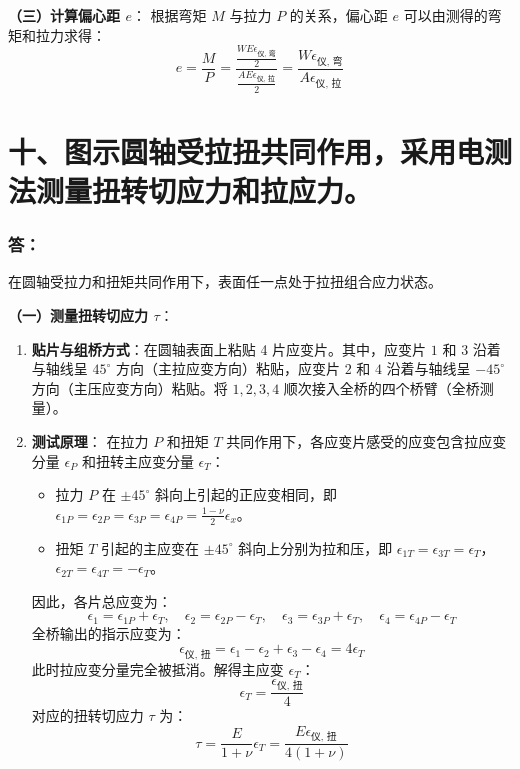 \documentclass[11pt,a4paper]{ctexrep}
\begin{document}
{\textbf{（三）计算偏心距 $e$}：
根据弯矩 $M$ 与拉力 $P$ 的关系，偏心距 $e$ 可以由测得的弯矩和拉力求得：
\[
    e = \frac{M}{P} = \frac{\frac{W E \epsilon_{\text{仪, 弯}}}{2}}{\frac{A E \epsilon_{\text{仪, 拉}}}{2}} = \frac{W \epsilon_{\text{仪, 弯}}}{A \epsilon_{\text{仪, 拉}}}
\]




\section*{十、图示圆轴受拉扭共同作用，采用电测法测量扭转切应力和拉应力。}

\subsubsection*{答：}

在圆轴受拉力和扭矩共同作用下，表面任一点处于拉扭组合应力状态。

\textbf{（一）测量扭转切应力 $\tau$}：
\begin{enumerate}
    \item \textbf{贴片与组桥方式}：在圆轴表面上粘贴 4 片应变片。其中，应变片 $1$ 和 $3$ 沿着与轴线呈 $45^\circ$ 方向（主拉应变方向）粘贴，应变片 $2$ 和 $4$ 沿着与轴线呈 $-45^\circ$ 方向（主压应变方向）粘贴。将 $1, 2, 3, 4$ 顺次接入全桥的四个桥臂（全桥测量）。
    \item \textbf{测试原理}：
          在拉力 $P$ 和扭矩 $T$ 共同作用下，各应变片感受的应变包含拉应变分量 $\epsilon_P$ 和扭转主应变分量 $\epsilon_T$：
          \begin{itemize}
              \item 拉力 $P$ 在 $\pm 45^\circ$ 斜向上引起的正应变相同，即 $\epsilon_{1P} = \epsilon_{2P} = \epsilon_{3P} = \epsilon_{4P} = \frac{1-\nu}{2}\epsilon_x$。
              \item 扭矩 $T$ 引起的主应变在 $\pm 45^\circ$ 斜向上分别为拉和压，即 $\epsilon_{1T} = \epsilon_{3T} = \epsilon_T$，$\epsilon_{2T} = \epsilon_{4T} = -\epsilon_T$。
          \end{itemize}
          因此，各片总应变为：
          \[
              \epsilon_1 = \epsilon_{1P} + \epsilon_T, \quad \epsilon_2 = \epsilon_{2P} - \epsilon_T, \quad \epsilon_3 = \epsilon_{3P} + \epsilon_T, \quad \epsilon_4 = \epsilon_{4P} - \epsilon_T
          \]
          全桥输出的指示应变为：
          \[
              \epsilon_{\text{仪, 扭}} = \epsilon_1 - \epsilon_2 + \epsilon_3 - \epsilon_4 = 4\epsilon_T
          \]
          此时拉应变分量完全被抵消。解得主应变 $\epsilon_T$：
          \[
              \epsilon_T = \frac{\epsilon_{\text{仪, 扭}}}{4}
          \]
          对应的扭转切应力 $\tau$ 为：
          \[
              \tau = \frac{E}{1+\nu} \epsilon_T = \frac{E \epsilon_{\text{仪, 扭}}}{4(1+\nu)}
          \]
\end{enumerate}

}
\end{document}
